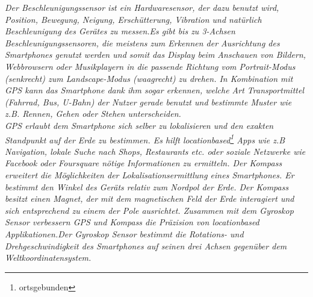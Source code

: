  \textit{Der Beschleunigungssensor ist ein Hardwaresensor, der dazu benutzt wird, Position, Bewegung, Neigung, Erschütterung, Vibration und natürlich Beschleunigung des Gerätes zu messen.Es gibt bis zu 3-Achsen Beschleunigungssensoren, die meistens zum Erkennen der Ausrichtung des \glspl{Smartphone} genutzt werden und somit das Display beim Anschauen von Bildern, Webbrowsern oder Musikplayern in die passende Richtung vom Portrait-Modus (senkrecht) zum Landscape-Modus (waagrecht) zu drehen. In Kombination mit \gls{GPS} kann das \gls{Smartphone} dank ihm sogar erkennen, welche Art Transportmittel (Fahrrad, Bus, U-Bahn) der Nutzer gerade benutzt und bestimmte Muster wie z.B. Rennen, Gehen oder Stehen unterscheiden.\\
\gls{GPS} erlaubt dem \gls{Smartphone} sich selber zu lokalisieren und den exakten Standpunkt auf der Erde zu bestimmen. Es hilft locationbased\footnote{ ortsgebunden} \Glspl{App} wie z.B Navigation, lokale Suche nach Shops, Restaurants etc. oder soziale Netzwerke wie Facebook oder Foursquare nötige Informationen zu ermitteln. Der Kompass erweitert die Möglichkeiten der Lokalisationsermittlung eines \gls{Smartphone}s. Er bestimmt den Winkel des Geräts relativ zum Nordpol der Erde. Der Kompass besitzt einen Magnet, der mit dem magnetischen Feld der Erde interagiert und sich entsprechend zu einem der Pole ausrichtet. Zusammen mit dem Gyroskop Sensor verbessern \gls{GPS} und Kompass die Präzision von locationbased Applikationen.Der Gyroskop Sensor bestimmt die Rotations- und Drehgeschwindigkeit des \gls{Smartphone}s auf seinen drei Achsen gegenüber dem Weltkoordinatensystem.}
